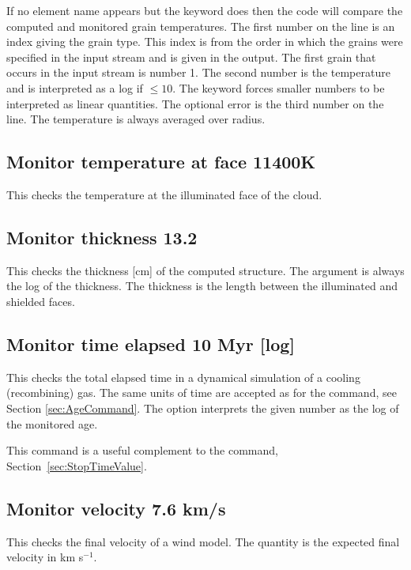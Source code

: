 If no element name appears but the keyword 
does then the code
will compare the computed and monitored grain temperatures.
The first number
on the line is an index giving the grain type.
This index is from the order
in which the grains were specified in the input stream and
is given in the output.
The first grain that occurs in the input stream is number 1.
The
second number is the temperature and is interpreted as a
log if $\le 10$.
The
 keyword forces smaller numbers to be
interpreted as linear quantities.
The optional error is the third number on the line.
The temperature is
always averaged over radius.

\subsection{Monitor temperature at face 11400K}

This checks the temperature at the illuminated face of the cloud.

\subsection{Monitor thickness 13.2}

This checks the thickness [cm] of the computed structure.
The argument
is always the log of the thickness.
The thickness is the length between
the illuminated and shielded faces.

\subsection{Monitor time elapsed 10 Myr [log]}

This checks the total elapsed time in a dynamical simulation of a cooling
(recombining) gas.
The same units of time are accepted as for the  command,
see Section \ref{sec:AgeCommand}.
The  option interprets the given number as the log of the
monitored age.

This command is a useful complement to the 
command, Section~\ref{sec:StopTimeValue}.

\subsection{Monitor velocity 7.6 km/s}

This checks the final velocity of a wind model.
The quantity is the
expected final velocity in km s$^{-1}$.

